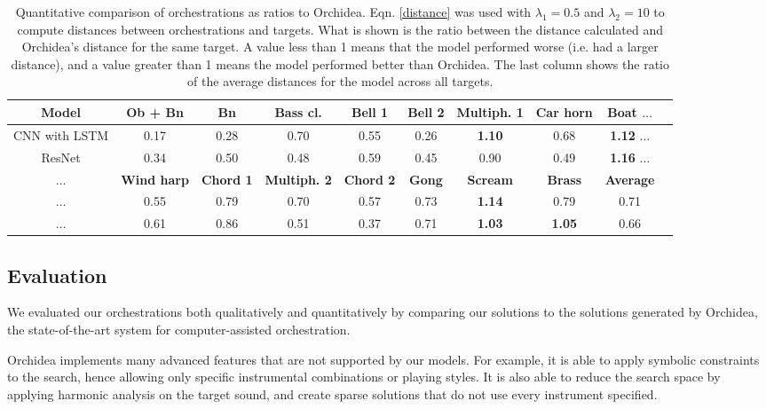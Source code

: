 \documentclass[runningheads,a4paper]{llncs}
\begin{document}
\begin{table}
  \centering
     \caption{Quantitative comparison of orchestrations as ratios to Orchidea. Eqn. \ref{distance} was used with $\lambda_1 = 0.5$ and $\lambda_2 = 10$ to compute distances between orchestrations and targets. What is shown is the ratio between the distance calculated and Orchidea's distance for the same target. A value less than 1 means that the model performed worse (i.e. had a larger distance), and a value greater than 1 means the model performed better than Orchidea. The last column shows the ratio of the average distances for the model across all targets.}\label{orch_eval}
	\centering    
    \begin{tabular}{|c|c|c|c|c|c|c|c|c|c}
     \hline
      \textbf{Model} & \textbf{Ob + Bn} & \textbf{Bn} & \textbf{Bass cl.} & \textbf{Bell 1} & \textbf{Bell 2} & \textbf{Multiph. 1} & \textbf{Car horn} & \textbf{Boat} $\ldots$ \\
      \hline
      CNN with LSTM & 0.17 & 0.28 & 0.70 & 0.55 & 0.26 & \textbf{1.10} & 0.68 & \textbf{1.12} $\ldots$  \\
      \hline
      ResNet & 0.34 & 0.50 & 0.48 & 0.59 & 0.45 & 0.90 & 0.49 & \textbf{1.16} $\ldots$ \\
      \hline
      \hline
      \textbf{$\ldots$} & \textbf{Wind harp} & \textbf{Chord 1} & \textbf{Multiph. 2} & \textbf{Chord 2} & \textbf{Gong} & \textbf{Scream} & \textbf{Brass} & \textbf{Average}  \\
      \hline
      $\ldots$ & 0.55 & 0.79 & 0.70 & 0.57 & 0.73 & \textbf{1.14} & 0.79 & 0.71\\
      \hline
      $\ldots$  & 0.61 & 0.86 & 0.51 & 0.37 & 0.71 & \textbf{1.03} & \textbf{1.05} & 0.66 \\
      \hline
    \end{tabular}

\end{table}

\subsection{Evaluation}

We evaluated our orchestrations both qualitatively and quantitatively by comparing our solutions to the solutions generated by Orchidea, the state-of-the-art system for computer-assisted orchestration. 

Orchidea implements many advanced features that are not supported by our models. For example, it is able to apply symbolic constraints to the search, hence allowing only specific instrumental combinations or playing styles. It is also able to reduce the search space by applying harmonic analysis on the target sound, and create sparse solutions that do not use every instrument specified.
\end{document}
